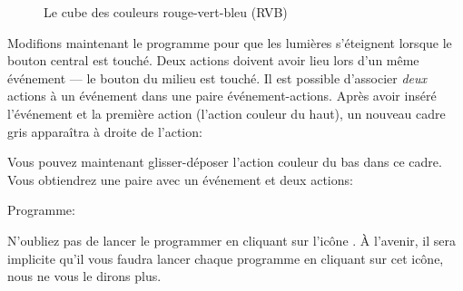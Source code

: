 \begin{figure}
\caption{Le cube des couleurs rouge-vert-bleu (RVB)}\label{fig.cube}
\end{figure}


Modifions maintenant le programme pour que les lumières s'éteignent lorsque le bouton central est touché.
Deux actions doivent avoir lieu lors d'un même événement --- le bouton du milieu est touché.
Il est possible d'associer \emph{deux} actions à un événement
dans une paire événement-actions.
Après avoir inséré l'événement et la première action (l'action couleur du haut), un nouveau cadre gris apparaîtra à droite de l'action:


Vous pouvez maintenant glisser-déposer l'action couleur du bas 
dans ce cadre.
Vous obtiendrez une paire avec un événement et deux actions:\label{p.multiple}


{\raggedleft \hfill Programme: }

N'oubliez pas de lancer le programmer en cliquant sur l'icône .
À l'avenir, il sera implicite qu'il vous faudra lancer chaque programme en cliquant sur cet icône, nous ne vous le dirons plus.

\bigskip

